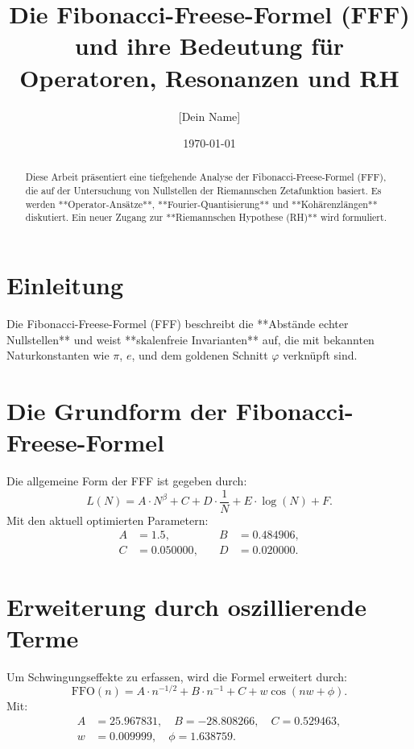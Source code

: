 \documentclass[a4paper,12pt]{article}
\title{Die Fibonacci-Freese-Formel (FFF) \\ und ihre Bedeutung für Operatoren, Resonanzen und RH}
\author{[Dein Name]}
\date{\today}
\begin{document}
\maketitle

\begin{abstract}
Diese Arbeit präsentiert eine tiefgehende Analyse der Fibonacci-Freese-Formel (FFF), 
die auf der Untersuchung von Nullstellen der Riemannschen Zetafunktion basiert. 
Es werden **Operator-Ansätze**, **Fourier-Quantisierung** und **Kohärenzlängen** diskutiert. 
Ein neuer Zugang zur **Riemannschen Hypothese (RH)** wird formuliert.
\end{abstract}

\section{Einleitung}
Die Fibonacci-Freese-Formel (FFF) beschreibt die **Abstände echter Nullstellen** und weist **skalenfreie Invarianten** auf, 
die mit bekannten Naturkonstanten wie $\pi$, $e$, und dem goldenen Schnitt $\varphi$ verknüpft sind.

\section{Die Grundform der Fibonacci-Freese-Formel}
Die allgemeine Form der FFF ist gegeben durch:
\begin{equation}
    L(N) = A \cdot N^\beta + C + D \cdot \frac{1}{N} + E \cdot \log(N) + F.
\end{equation}
Mit den aktuell optimierten Parametern:
\begin{align*}
    A &= 1.5, \quad &B &= 0.484906, \\
    C &= 0.050000, \quad &D &= 0.020000.
\end{align*}

\section{Erweiterung durch oszillierende Terme}
Um Schwingungseffekte zu erfassen, wird die Formel erweitert durch:
\begin{equation}
    \text{FFO}(n) = A \cdot n^{-1/2} + B \cdot n^{-1} + C + w \cos(nw + \phi).
\end{equation}
Mit:
\begin{align*}
    A &= 25.967831, \quad B = -28.808266, \quad C = 0.529463, \\
    w &= 0.009999, \quad \phi = 1.638759.
\end{align*}
\end{document}
